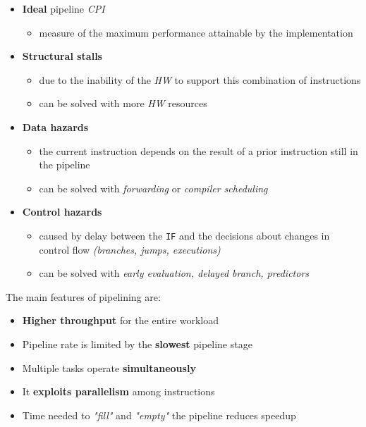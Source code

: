 \documentclass[english]{article}
\begin{document}
\begin{itemize}
  \item \textbf{Ideal} pipeline \textit{CPI}
        \begin{itemize}
          \item measure of the maximum performance attainable by the implementation
        \end{itemize}
  \item \textbf{Structural stalls}
        \begin{itemize}
          \item due to the inability of the \textit{HW} to support this combination of instructions
          \item can be solved with more \textit{HW} resources
        \end{itemize}
  \item \textbf{Data hazards}
        \begin{itemize}
          \item the current instruction depends on the result of a prior instruction still in the pipeline
          \item can be solved with \textit{forwarding} or \textit{compiler scheduling}
        \end{itemize}
  \item \textbf{Control hazards}
        \begin{itemize}
          \item caused by delay between the \texttt{IF} and the decisions about changes in control flow \textit{(branches, jumps, executions)}
          \item can be solved with \textit{early evaluation, delayed branch, predictors}
        \end{itemize}
\end{itemize}

\bigskip
The main features of pipelining are:
\begin{itemize}
  \item \textbf{Higher throughput} for the entire workload
  \item Pipeline rate is limited by the \textbf{slowest} pipeline stage
  \item Multiple tasks operate \textbf{simultaneously}
  \item It \textbf{exploits parallelism} among instructions
  \item Time needed to \textit{"fill"} and \textit{"empty"} the pipeline reduces speedup
\end{itemize}
\end{document}
